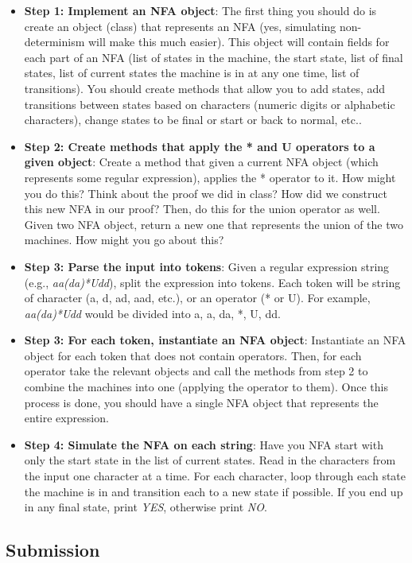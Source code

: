\documentclass[11pt]{article}
\begin{document}
\begin{itemize}
	\item \textbf{Step 1: Implement an NFA object}: The first thing you should do is create an object (class) that represents an NFA (yes, simulating non-determinism will make this much easier). This object will contain fields for each part of an NFA (list of states in the machine, the start state, list of final states, list of current states the machine is in at any one time, list of transitions). You should create methods that allow you to add states, add transitions between states based on characters (numeric digits or alphabetic characters), change states to be final or start or back to normal, etc.. 
	\item \textbf{Step 2: Create methods that apply the * and U operators to a given object}: Create a method that given a current NFA object (which represents some regular expression), applies the * operator to it. How might you do this? Think about the proof we did in class? How did we construct this new NFA in our proof? Then, do this for the union operator as well. Given two NFA object, return a new one that represents the union of the two machines. How might you go about this?
	\item \textbf{Step 3: Parse the input into tokens}: Given a regular expression string (e.g., \emph{aa(da)*Udd}), split the expression into tokens. Each token will be string of character (a, d, ad, aad, etc.), or an operator (* or U). For example, \emph{aa(da)*Udd} would be divided into a, a, da, *, U, dd.
	\item \textbf{Step 3: For each token, instantiate an NFA object}: Instantiate an NFA object for each token that does not contain operators. Then, for each operator take the relevant objects and call the methods from step 2 to combine the machines into one (applying the operator to them). Once this process is done, you should have a single NFA object that represents the entire expression.
	\item \textbf{Step 4: Simulate the NFA on each string}: Have you NFA start with only the start state in the list of current states. Read in the characters from the input one character at a time. For each character, loop through each state the machine is in and transition each to a new state if possible. If you end up in any final state, print \emph{YES}, otherwise print \emph{NO}.
\end{itemize}

\subsection*{Submission}
\end{document}
